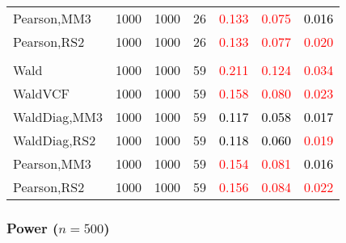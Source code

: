 \documentclass[
]{article}
\begin{document}
\begin{table}[H]
{\begin{tabular}[t]{lrrrrrr}
\hspace{1em}Pearson,MM3 & 1000 & 1000 & 26 & \textcolor{red}{0.133} & \textcolor{red}{0.075} & \textcolor{black}{0.016}\\
\hspace{1em}Pearson,RS2 & 1000 & 1000 & 26 & \textcolor{red}{0.133} & \textcolor{red}{0.077} & \textcolor{red}{0.020}\\
\addlinespace[0.3em]
\multicolumn{7}{l}{\textbf{3F 15V}}\\
\hspace{1em}Wald & 1000 & 1000 & 59 & \textcolor{red}{0.211} & \textcolor{red}{0.124} & \textcolor{red}{0.034}\\
\hspace{1em}WaldVCF & 1000 & 1000 & 59 & \textcolor{red}{0.158} & \textcolor{red}{0.080} & \textcolor{red}{0.023}\\
\hspace{1em}WaldDiag,MM3 & 1000 & 1000 & 59 & \textcolor{black}{0.117} & \textcolor{black}{0.058} & \textcolor{black}{0.017}\\
\hspace{1em}WaldDiag,RS2 & 1000 & 1000 & 59 & \textcolor{black}{0.118} & \textcolor{black}{0.060} & \textcolor{red}{0.019}\\
\hspace{1em}Pearson,MM3 & 1000 & 1000 & 59 & \textcolor{red}{0.154} & \textcolor{red}{0.081} & \textcolor{black}{0.016}\\
\hspace{1em}Pearson,RS2 & 1000 & 1000 & 59 & \textcolor{red}{0.156} & \textcolor{red}{0.084} & \textcolor{red}{0.022}\\
\bottomrule
\end{tabular}}
\endgroup{}
\end{table}

\hypertarget{power-n500-3}{%
\subsubsection{\texorpdfstring{Power
(\(n=500\))}{Power (n=500)}}\label{power-n500-3}}
\end{document}
